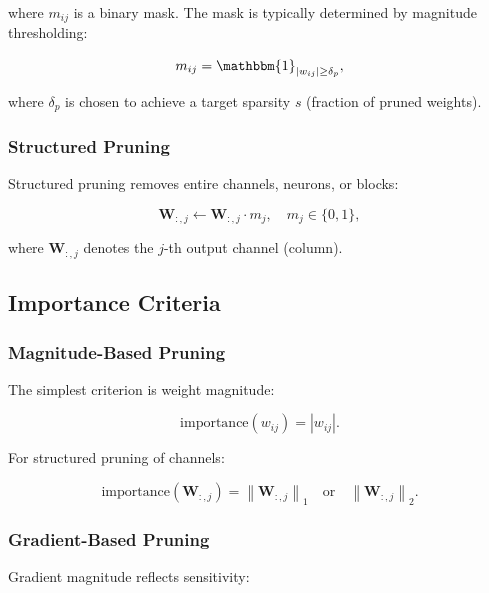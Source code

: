 \documentclass[12pt]{report}
\theoremstyle{definition}
\newcommand{\norm}[1]{\left\| #1 \right\|}
\begin{document}
where $m_{ij}$ is a binary mask. The mask is typically determined by magnitude thresholding:

\begin{equation}
m_{ij} = \mathbbm{1}_{|w_{ij}| \geq \delta_p},
\label{eq:magnitude_mask}
\end{equation}

where $\delta_p$ is chosen to achieve a target sparsity $s$ (fraction of pruned weights).

\subsubsection{Structured Pruning}

Structured pruning removes entire channels, neurons, or blocks:

\begin{equation}
\mathbf{W}_{:,j} \leftarrow \mathbf{W}_{:,j} \cdot m_j, \quad m_j \in \{0, 1\},
\label{eq:structured_prune}
\end{equation}

where $\mathbf{W}_{:,j}$ denotes the $j$-th output channel (column).

\subsection{Importance Criteria}

\subsubsection{Magnitude-Based Pruning}

The simplest criterion is weight magnitude:

\begin{equation}
\text{importance}(w_{ij}) = |w_{ij}|.
\label{eq:importance_magnitude}
\end{equation}

For structured pruning of channels:

\begin{equation}
\text{importance}(\mathbf{W}_{:,j}) = \norm{\mathbf{W}_{:,j}}_1 \quad \text{or} \quad \norm{\mathbf{W}_{:,j}}_2.
\label{eq:importance_channel}
\end{equation}

\subsubsection{Gradient-Based Pruning}

Gradient magnitude reflects sensitivity:
\end{document}
